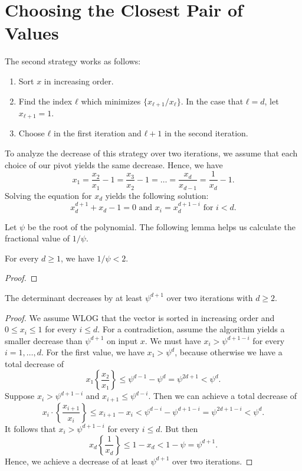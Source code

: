 \section{Choosing the Closest Pair of Values}

The second strategy works as follows:
\begin{enumerate}
  \item Sort $x$ in increasing order.
  \item Find the index $ℓ$ which minimizes $\{x_{ℓ+1}/x_ℓ\}$.
    In the case that $ℓ = d$, let $x_{ℓ + 1} = 1$.
  \item Choose $ℓ$ in the first iteration and $ℓ + 1$ in the second iteration.
\end{enumerate}

To analyze the decrease of this strategy over two iterations,
we assume that each choice of our pivot yields the same decrease.
Hence, we have
\[
  x_1 = \frac{x_2}{x_1} - 1 = \frac{x_3}{x_2} - 1 = \dots = \frac{x_d}{x_{d-1}} = \frac{1}{x_d} - 1.
\]
Solving the equation for $x_d$ yields the following solution:
\[
  x_d^{d+1} + x_d - 1 = 0 \text{ and } x_i = x_d^{d+1-i} \text{ for } i < d.
\]

Let $ψ$ be the root of the polynomial.
The following lemma helps us calculate the fractional value of $1/ψ$.

\begin{lemma}
  For every $d ≥ 1$, we have $1/ψ < 2$.
\end{lemma}

\begin{proof}

\end{proof}

\begin{theorem}
  The determinant decreases by at least $ψ^{d+1}$ over two iterations with $d ≥ 2$.
\end{theorem}

\begin{proof}
  We assume WLOG that the vector is sorted in increasing order and
  $0 ≤ x_i ≤ 1$ for every $i ≤ d$.
  For a contradiction, assume the algorithm yields a smaller decrease than $ψ^{d+1}$ on input $x$.
  We must have $x_i > ψ^{d+1-i}$ for every $i = 1, \dots, d$.
  For the first value, we have $x₁ > ψ^d$, because otherwise we have a total decrease of
  \[
    x₁ \left\{ \frac{x₂}{x₁} \right\} ≤ ψ^{d-1} - ψ^d = ψ^{2d+1} < ψ^d.
  \]
  Suppose $x_i > ψ^{d+1-i}$ and $x_{i+1} ≤ ψ^{d-i}$.
  Then we can achieve a total decrease of
  \[
    x_i · \left\{ \frac{x_{i+1}}{x_i} \right\} ≤ x_{i+1} - x_i < ψ^{d-i} - ψ^{d+1-i} = ψ^{2d+1-i} < ψ^d.
  \]
  It follows that $x_i > ψ^{d+1-i}$ for every $i ≤ d$.
  But then
  \[
    x_d \left\{ \frac{1}{x_d} \right\} ≤ 1 - x_d < 1 - ψ = ψ^{d+1}.
  \]
  Hence, we achieve a decrease of at least $ψ^{d+1}$ over two iterations.
\end{proof}

